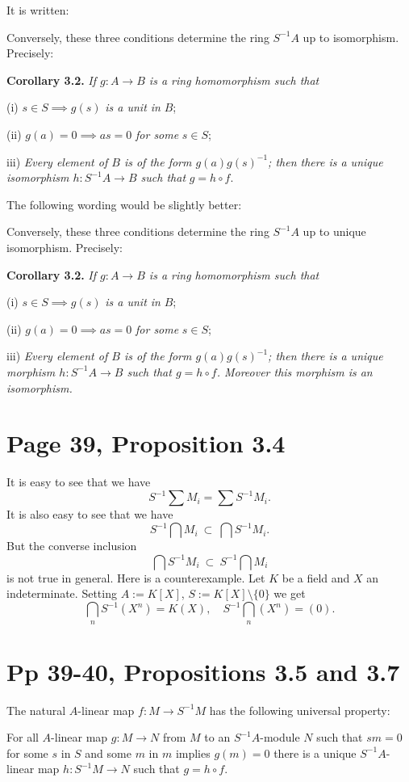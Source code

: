 \documentclass[12pt]{article}
\begin{document}
It is written:

Conversely, these three conditions determine the ring $S^{-1}A$ up to isomorphism. Precisely:

\textbf{Corollary 3.2.} \emph{If $g:A\to B$ is a ring homomorphism such that}

(i) $s\in S\implies g(s)$ \emph{is a unit in} $B$;

(ii) $g(a)=0\implies as=0$ \emph{for some} $s\in S$;

iii) \emph{Every element of $B$ is of the form $g(a)g(s)^{-1}$; then there is a unique isomorphism $h:S^{-1}A\to B$ such that} $g=h\circ f$.

The following wording would be slightly better:

Conversely, these three conditions determine the ring $S^{-1}A$ up to unique isomorphism. Precisely:

\textbf{Corollary 3.2.} \emph{If $g:A\to B$ is a ring homomorphism such that}

(i) $s\in S\implies g(s)$ \emph{is a unit in} $B$;

(ii) $g(a)=0\implies as=0$ \emph{for some} $s\in S$;

iii) \emph{Every element of $B$ is of the form $g(a)g(s)^{-1}$; then there is a unique morphism $h:S^{-1}A\to B$ such that $g=h\circ f$. Moreover this morphism is an isomorphism.}

\section{Page 39, Proposition 3.4}%

It is easy to see that we have 
$$
S^{-1}\sum M_i=\sum S^{-1}M_i.
$$ 
It is also easy to see that we have 
$$
S^{-1}\bigcap M_i\ \subset\ \bigcap S^{-1}M_i.
$$ 
But the converse inclusion 
$$
\bigcap S^{-1}M_i\ \subset\ S^{-1}\bigcap M_i
$$ 
is not true in general. Here is a counterexample. Let $K$ be a field and $X$ an indeterminate. Setting $A:=K[X]$, $S:=K[X]\setminus\{0\}$ we get 
$$
\bigcap_n S^{-1}(X^n)=K(X),\quad S^{-1}\bigcap_n(X^n)=(0).
$$

\section{Pp 39-40, Propositions 3.5 and 3.7}%

The natural $A$-linear map $f:M\to S^{-1}M$ has the following universal property:

For all $A$-linear map $g:M\to N$ from $M$ to an $S^{-1}A$-module $N$ such that $sm=0$ for some $s$ in $S$ and some $m$ in $m$ implies $g(m)=0$ there is a unique $S^{-1}A$-linear map $h:S^{-1}M\to N$ such that $g=h\circ f$.
\end{document}
